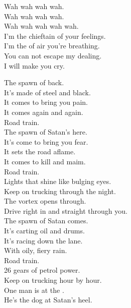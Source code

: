 Wah wah wah wah. \\
Wah wah wah wah. \\
Wah wah wah wah wah. \\

I'm the chieftain of your feelings. \\
I'm the  of air you're breathing. \\
You can not escape my dealing. \\
I will make you cry. \\




The spawn of  back. \\
It's made of steel and black. \\
It comes to bring you pain. \\
It comes again and again. \\

Road train. \\

The spawn of Satan's here. \\
It's come to bring you fear. \\
It sets the road aflame. \\
It comes to kill and maim. \\

Road train. \\

Lights that shine like bulging eyes. \\
Keep on trucking through the night. \\
The vortex opens through. \\
Drive right in and straight through you. \\

The spawn of Satan comes. \\
It's carting oil and drums. \\
It's racing down the lane. \\
With oily, fiery rain. \\

Road train. \\

26 gears of petrol power. \\
Keep on trucking hour by hour. \\
One man is at the . \\
He's the dog at Satan's heel. \\

